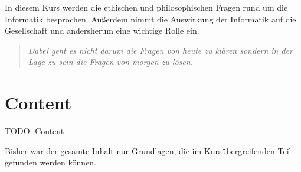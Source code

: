 \documentclass[../main.tex]{subfiles}
\begin{document}
    In diesem Kurs werden die ethischen und philosophischen Fragen rund um die Informatik besprochen. Außerdem nimmt die Auswirkung der Informatik auf die Gesellschaft und andersherum eine wichtige Rolle ein.
    
    \begin{quote}
        \emph{Dabei geht es nicht darum die Fragen von heute zu klären sondern in der Lage zu sein die Fragen von morgen zu lösen.}
    \end{quote}
    \clearpage

    \section{Content}
        TODO: Content
        
        Bisher war der gesamte Inhalt nur Grundlagen, die im Kursübergreifenden Teil gefunden werden können.
\end{document}
